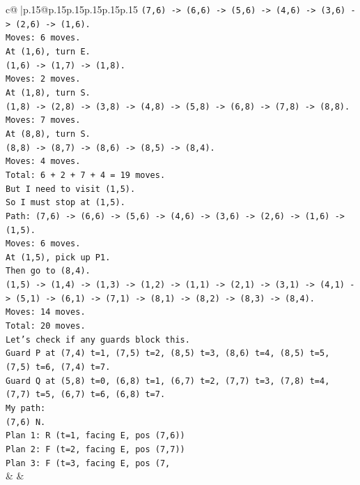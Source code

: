 \documentclass{article}
\begin{document}
{\begin{supertabular}{c@{$\;$}|p{.15\linewidth}@{}p{.15\linewidth}p{.15\linewidth}p{.15\linewidth}p{.15\linewidth}p{.15\linewidth}}
{{{\texttt{(7,6) {-}> (6,6) {-}> (5,6) {-}> (4,6) {-}> (3,6) {-}> (2,6) {-}> (1,6).} \\
\texttt{Moves: 6 moves.} \\
\texttt{At (1,6), turn E.} \\
\texttt{(1,6) {-}> (1,7) {-}> (1,8).} \\
\texttt{Moves: 2 moves.} \\
\texttt{At (1,8), turn S.} \\
\texttt{(1,8) {-}> (2,8) {-}> (3,8) {-}> (4,8) {-}> (5,8) {-}> (6,8) {-}> (7,8) {-}> (8,8).} \\
\texttt{Moves: 7 moves.} \\
\texttt{At (8,8), turn S.} \\
\texttt{(8,8) {-}> (8,7) {-}> (8,6) {-}> (8,5) {-}> (8,4).} \\
\texttt{Moves: 4 moves.} \\
\texttt{Total: 6 + 2 + 7 + 4 = 19 moves.} \\
\texttt{But I need to visit (1,5).} \\
\texttt{So I must stop at (1,5).} \\
\texttt{Path: (7,6) {-}> (6,6) {-}> (5,6) {-}> (4,6) {-}> (3,6) {-}> (2,6) {-}> (1,6) {-}> (1,5).} \\
\texttt{Moves: 6 moves.} \\
\texttt{At (1,5), pick up P1.} \\
\texttt{Then go to (8,4).} \\
\texttt{(1,5) {-}> (1,4) {-}> (1,3) {-}> (1,2) {-}> (1,1) {-}> (2,1) {-}> (3,1) {-}> (4,1) {-}> (5,1) {-}> (6,1) {-}> (7,1) {-}> (8,1) {-}> (8,2) {-}> (8,3) {-}> (8,4).} \\
\texttt{Moves: 14 moves.} \\
\texttt{Total: 20 moves.} \\
\texttt{Let's check if any guards block this.} \\
\texttt{Guard P at (7,4) t=1, (7,5) t=2, (8,5) t=3, (8,6) t=4, (8,5) t=5, (7,5) t=6, (7,4) t=7.} \\
\texttt{Guard Q at (5,8) t=0, (6,8) t=1, (6,7) t=2, (7,7) t=3, (7,8) t=4, (7,7) t=5, (6,7) t=6, (6,8) t=7.} \\
\texttt{My path:} \\
\texttt{(7,6) N.} \\
\texttt{Plan 1: R (t=1, facing E, pos (7,6))} \\
\texttt{Plan 2: F (t=2, facing E, pos (7,7))} \\
\texttt{Plan 3: F (t=3, facing E, pos (7,} \\
            }
        }
    }
    & & \\ \\


\end{supertabular}}
\end{document}
